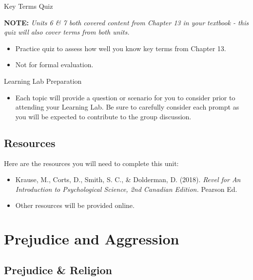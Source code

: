\documentclass[
]{book}
\providecommand{\tightlist}{%
  \setlength{\itemsep}{0pt}\setlength{\parskip}{0pt}}
\begin{document}
\begin{reflect}
{Key Terms Quiz}

\textbf{NOTE:} \emph{Units 6 \& 7 both covered content from Chapter 13 in your textbook - this quiz will also cover terms from both units.}

\begin{itemize}
\tightlist
\item
  Practice quiz to assess how well you know key terms from Chapter 13.\\
\item
  Not for formal evaluation.
\end{itemize}

{Learning Lab Preparation}

\begin{itemize}
\tightlist
\item
  Each topic will provide a question or scenario for you to consider prior to attending your Learning Lab. Be sure to carefully consider each prompt as you will be expected to contribute to the group discussion.
\end{itemize}
\end{reflect}

\hypertarget{resources-7}{%
\subsection*{Resources}\label{resources-7}}

Here are the resources you will need to complete this unit:

\begin{itemize}
\tightlist
\item
  Krause, M., Corts, D., Smith, S. C., \& Dolderman, D. (2018). \emph{Revel for An Introduction to Psychological Science, 2nd Canadian Edition.} Pearson Ed.\\
\item
  Other resources will be provided online.
\end{itemize}

\hypertarget{prejudice-and-aggression}{%
\section{Prejudice and Aggression}\label{prejudice-and-aggression}}

\hypertarget{prejudice-religion}{%
\subsection*{Prejudice \& Religion}\label{prejudice-religion}}
\end{document}

